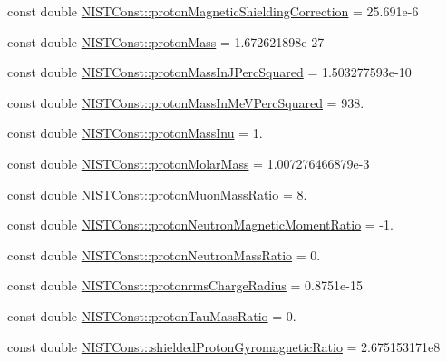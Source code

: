 \begin{DoxyCompactItemize}
\item 
const double \mbox{\hyperlink{group___n_i_s_t_const-_proton_ga401cef12f93ba64cca44703bbdb516e7}{N\+I\+S\+T\+Const\+::proton\+Magnetic\+Shielding\+Correction}} = 25.\+691e-\/6
\item 
const double \mbox{\hyperlink{group___n_i_s_t_const-_proton_gaa6738785a6bf04323231318dd6b2ed90}{N\+I\+S\+T\+Const\+::proton\+Mass}} = 1.\+672621898e-\/27
\item 
const double \mbox{\hyperlink{group___n_i_s_t_const-_proton_gae46a62aa4ccd40b74db6a45a3933cf0f}{N\+I\+S\+T\+Const\+::proton\+Mass\+In\+J\+Perc\+Squared}} = 1.\+503277593e-\/10
\item 
const double \mbox{\hyperlink{group___n_i_s_t_const-_proton_gad2f4fab753bd216193f8c31ced93d46d}{N\+I\+S\+T\+Const\+::proton\+Mass\+In\+Me\+V\+Perc\+Squared}} = 938.
\item 
const double \mbox{\hyperlink{group___n_i_s_t_const-_proton_gaf2a9916164fce50112bd8bbe8b712e5a}{N\+I\+S\+T\+Const\+::proton\+Mass\+Inu}} = 1.
\item 
const double \mbox{\hyperlink{group___n_i_s_t_const-_proton_ga8a29760b90301104dbd9512674eccc4c}{N\+I\+S\+T\+Const\+::proton\+Molar\+Mass}} = 1.\+007276466879e-\/3
\item 
const double \mbox{\hyperlink{group___n_i_s_t_const-_proton_gab9c5458c70434c20a8527661c4ff0b73}{N\+I\+S\+T\+Const\+::proton\+Muon\+Mass\+Ratio}} = 8.
\item 
const double \mbox{\hyperlink{group___n_i_s_t_const-_proton_ga349fed5e91e8d7f8d71ba45405da64e7}{N\+I\+S\+T\+Const\+::proton\+Neutron\+Magnetic\+Moment\+Ratio}} = -\/1.
\item 
const double \mbox{\hyperlink{group___n_i_s_t_const-_proton_ga8b54a81cc7dec7f196f874dcc81dbab2}{N\+I\+S\+T\+Const\+::proton\+Neutron\+Mass\+Ratio}} = 0.
\item 
const double \mbox{\hyperlink{group___n_i_s_t_const-_proton_gadc726e50679ce96f2d6c0e84c378998e}{N\+I\+S\+T\+Const\+::protonrms\+Charge\+Radius}} = 0.\+8751e-\/15
\item 
const double \mbox{\hyperlink{group___n_i_s_t_const-_proton_ga6b8624fb113601433f311bb5d3423115}{N\+I\+S\+T\+Const\+::proton\+Tau\+Mass\+Ratio}} = 0.
\item 
const double \mbox{\hyperlink{group___n_i_s_t_const-_proton_ga2affce442da8b445cce1c580b41bbd82}{N\+I\+S\+T\+Const\+::shielded\+Proton\+Gyromagnetic\+Ratio}} = 2.\+675153171e8
\item 

\end{DoxyCompactItemize}
